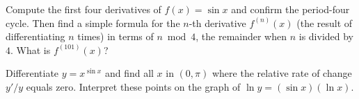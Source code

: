 \begin{exercise}
\label{ch12:exr-higher}
Compute the first four derivatives of $f(x)=\sin x$ and confirm the
period-four cycle. Then find a simple formula for the $n$-th derivative
$f^{(n)}(x)$ (the result of differentiating $n$ times) in terms of
$n \bmod 4$, the remainder when $n$ is divided by $4$. What is $f^{(101)}(x)$?
\end{exercise}

\begin{exercise}
\label{ch12:exr-challenge}
Differentiate $y = x^{\sin x}$ and find all $x$ in $(0,\pi)$ where the
relative rate of change $y'/y$ equals zero. Interpret these points on the
graph of $\ln y = (\sin x)(\ln x)$.
\end{exercise}
